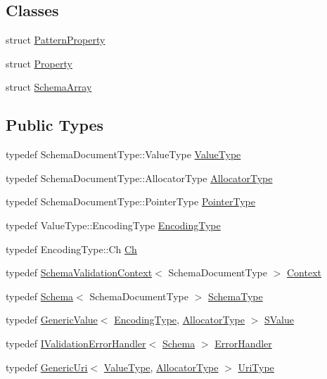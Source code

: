 \subsection*{Classes}
\begin{DoxyCompactItemize}
\item 
struct \hyperlink{structinternal_1_1Schema_1_1PatternProperty}{Pattern\+Property}
\item 
struct \hyperlink{structinternal_1_1Schema_1_1Property}{Property}
\item 
struct \hyperlink{structinternal_1_1Schema_1_1SchemaArray}{Schema\+Array}
\end{DoxyCompactItemize}
\subsection*{Public Types}
\begin{DoxyCompactItemize}
\item 
typedef Schema\+Document\+Type\+::\+Value\+Type \hyperlink{classinternal_1_1Schema_a8976b6d7e2a885483d0b51d941019340}{Value\+Type}
\item 
typedef Schema\+Document\+Type\+::\+Allocator\+Type \hyperlink{classinternal_1_1Schema_a7af392edd81e610754cd2e6b4f82761c}{Allocator\+Type}
\item 
typedef Schema\+Document\+Type\+::\+Pointer\+Type \hyperlink{classinternal_1_1Schema_a13d7dbba6e4a77b10862546777c5aae8}{Pointer\+Type}
\item 
typedef Value\+Type\+::\+Encoding\+Type \hyperlink{classinternal_1_1Schema_a9ea269c3ca8099c2a14b6519fe34efb1}{Encoding\+Type}
\item 
typedef Encoding\+Type\+::\+Ch \hyperlink{classinternal_1_1Schema_a98043fca39adbf8b42e7472e3d80d6fa}{Ch}
\item 
typedef \hyperlink{structinternal_1_1SchemaValidationContext}{Schema\+Validation\+Context}$<$ Schema\+Document\+Type $>$ \hyperlink{classinternal_1_1Schema_ac3f54abfefe300c5610c1205869cfd66}{Context}
\item 
typedef \hyperlink{classinternal_1_1Schema}{Schema}$<$ Schema\+Document\+Type $>$ \hyperlink{classinternal_1_1Schema_ac2556ebf7a7db971e1c1c0f76eb5786e}{Schema\+Type}
\item 
typedef \hyperlink{classGenericValue}{Generic\+Value}$<$ \hyperlink{classinternal_1_1Schema_a9ea269c3ca8099c2a14b6519fe34efb1}{Encoding\+Type}, \hyperlink{classinternal_1_1Schema_a7af392edd81e610754cd2e6b4f82761c}{Allocator\+Type} $>$ \hyperlink{classinternal_1_1Schema_ab3a07540a27d4cc2b0e260290c5c5771}{S\+Value}
\item 
typedef \hyperlink{classinternal_1_1IValidationErrorHandler}{I\+Validation\+Error\+Handler}$<$ \hyperlink{classinternal_1_1Schema}{Schema} $>$ \hyperlink{classinternal_1_1Schema_a2f8b106324878cdfc614df855e8bc6cc}{Error\+Handler}
\item 
typedef \hyperlink{classGenericUri}{Generic\+Uri}$<$ \hyperlink{classinternal_1_1Schema_a8976b6d7e2a885483d0b51d941019340}{Value\+Type}, \hyperlink{classinternal_1_1Schema_a7af392edd81e610754cd2e6b4f82761c}{Allocator\+Type} $>$ \hyperlink{classinternal_1_1Schema_a3b6cd85c3eeebe870cf8017d9d131d35}{Uri\+Type}
\end{DoxyCompactItemize}
